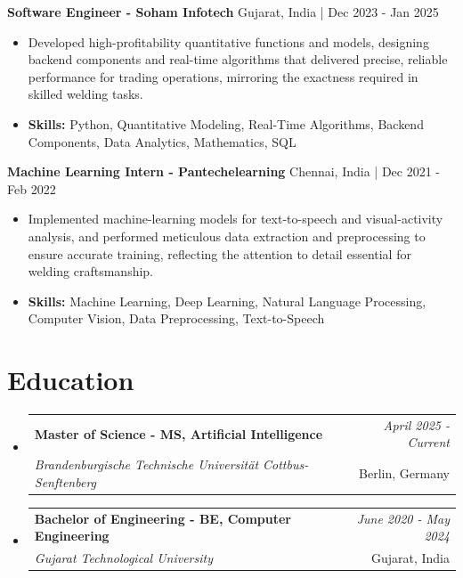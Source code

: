 \documentclass[a4paper,11pt]{article}
\makeatletter
\newcommand{\resumeSubheading}[4]{
\vspace{0.5mm}\item
    \begin{tabular*}{\linewidth}[t]{l@{\extracolsep{\fill}}r}
        \textbf{#1} & \textit{\footnotesize{#4}} \\
        \textit{\footnotesize{#3}} &  \footnotesize{#2}\\
    \end{tabular*}
    \vspace{-2.4mm}
}
\makeatother
\begin{document}
\vspace{1mm}
  \textbf{Software Engineer - Soham Infotech} \hfill Gujarat, India | Dec 2023 - Jan 2025
\vspace{-1.5mm} %
\begin{itemize}
  \item Developed high-profitability quantitative functions and models, designing backend components and real-time algorithms that delivered precise, reliable performance for trading operations, mirroring the exactness required in skilled welding tasks.

\vspace{-2mm}
  \item \textbf{Skills:} Python, Quantitative Modeling, Real-Time Algorithms, Backend Components, Data Analytics, Mathematics, SQL
\end{itemize}

\vspace{1mm}
  \textbf{Machine Learning Intern - Pantechelearning} \hfill Chennai, India | Dec 2021 - Feb 2022
\vspace{-1.5mm} %
\begin{itemize}
  \item Implemented machine-learning models for text-to-speech and visual-activity analysis, and performed meticulous data extraction and preprocessing to ensure accurate training, reflecting the attention to detail essential for welding craftsmanship.
\vspace{-2mm}
  \item \textbf{Skills:} Machine Learning, Deep Learning, Natural Language Processing, Computer Vision, Data Preprocessing, Text-to-Speech
\end{itemize}\section{\textbf{Education}}
\vspace{-0.4mm}

\begin{itemize}[leftmargin=0.15in, label={}]
\resumeSubheading
{Master of Science - MS, Artificial Intelligence }{Berlin, Germany}
{Brandenburgische Technische Universität Cottbus-Senftenberg  }{April 2025 - Current}

\vspace{1.0mm} %
\resumeSubheading
{Bachelor of Engineering - BE, Computer Engineering  }{Gujarat, India}
{Gujarat Technological University }{June 2020 - May 2024}

\end{itemize}
\end{document}
